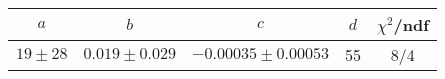\begin{tabular}{c|c|c|c|c}
$a$ & $b$ & $c$ & $d$ & $\chi^2$/ndf \\
\hline
$19\pm28$ & $0.019\pm0.029$ & $-0.00035\pm0.00053$ & 55 & 8/4
\end{tabular}
